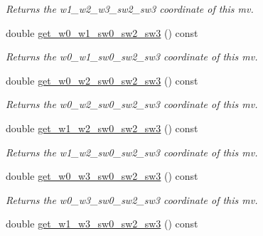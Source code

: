\begin{DoxyCompactItemize}
\begin{DoxyCompactList}\small\item\em Returns the w1\-\_\-w2\-\_\-w3\-\_\-sw2\-\_\-sw3 coordinate of this mv. \end{DoxyCompactList}\item 
\hypertarget{classe3ga_1_1mv_a7db712ba5805455dcb1c9add66fd5ff1}{double \hyperlink{classe3ga_1_1mv_a7db712ba5805455dcb1c9add66fd5ff1}{get\-\_\-w0\-\_\-w1\-\_\-sw0\-\_\-sw2\-\_\-sw3} () const }\label{classe3ga_1_1mv_a7db712ba5805455dcb1c9add66fd5ff1}

\begin{DoxyCompactList}\small\item\em Returns the w0\-\_\-w1\-\_\-sw0\-\_\-sw2\-\_\-sw3 coordinate of this mv. \end{DoxyCompactList}\item 
\hypertarget{classe3ga_1_1mv_a217cf812ea6864b4e8c88cb60a2186a7}{double \hyperlink{classe3ga_1_1mv_a217cf812ea6864b4e8c88cb60a2186a7}{get\-\_\-w0\-\_\-w2\-\_\-sw0\-\_\-sw2\-\_\-sw3} () const }\label{classe3ga_1_1mv_a217cf812ea6864b4e8c88cb60a2186a7}

\begin{DoxyCompactList}\small\item\em Returns the w0\-\_\-w2\-\_\-sw0\-\_\-sw2\-\_\-sw3 coordinate of this mv. \end{DoxyCompactList}\item 
\hypertarget{classe3ga_1_1mv_a5aa57a5d8253c05462b56151782421f7}{double \hyperlink{classe3ga_1_1mv_a5aa57a5d8253c05462b56151782421f7}{get\-\_\-w1\-\_\-w2\-\_\-sw0\-\_\-sw2\-\_\-sw3} () const }\label{classe3ga_1_1mv_a5aa57a5d8253c05462b56151782421f7}

\begin{DoxyCompactList}\small\item\em Returns the w1\-\_\-w2\-\_\-sw0\-\_\-sw2\-\_\-sw3 coordinate of this mv. \end{DoxyCompactList}\item 
\hypertarget{classe3ga_1_1mv_a57fbb361d457c2f2813efb4ab8300f34}{double \hyperlink{classe3ga_1_1mv_a57fbb361d457c2f2813efb4ab8300f34}{get\-\_\-w0\-\_\-w3\-\_\-sw0\-\_\-sw2\-\_\-sw3} () const }\label{classe3ga_1_1mv_a57fbb361d457c2f2813efb4ab8300f34}

\begin{DoxyCompactList}\small\item\em Returns the w0\-\_\-w3\-\_\-sw0\-\_\-sw2\-\_\-sw3 coordinate of this mv. \end{DoxyCompactList}\item 
\hypertarget{classe3ga_1_1mv_ad67ed86a778e3b9d7c97ffa310226ee9}{double \hyperlink{classe3ga_1_1mv_ad67ed86a778e3b9d7c97ffa310226ee9}{get\-\_\-w1\-\_\-w3\-\_\-sw0\-\_\-sw2\-\_\-sw3} () const }\label{classe3ga_1_1mv_ad67ed86a778e3b9d7c97ffa310226ee9}


\end{DoxyCompactItemize}
